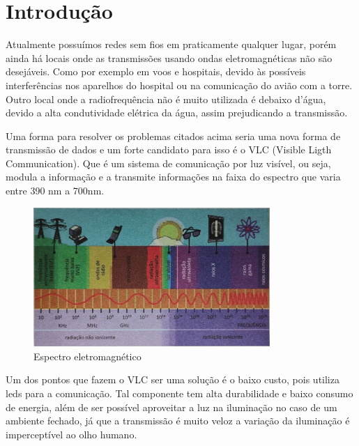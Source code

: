 \section{Introdução}

Atualmente possuímos redes sem fios em praticamente qualquer lugar, porém ainda há locais onde as transmissões usando ondas eletromagnéticas não são desejáveis. Como por exemplo em voos e hospitais, devido às possíveis interferências nos aparelhos do hospital ou na comunicação do avião com a torre. Outro local onde a radiofrequência não é muito utilizada é debaixo d'água, devido a alta condutividade elétrica da água, assim prejudicando a transmissão.

Uma forma para resolver os problemas citados acima seria uma nova forma de transmissão de dados e um forte candidato para isso é o VLC (Visible Ligth Communication). Que é um sistema de comunicação por luz visível, ou seja, modula a informação e a transmite informações na faixa do espectro que varia entre 390 nm a 700nm.

\begin{figure}[h]
  \centering
  \caption{Espectro eletromagnético}
  \includegraphics[width=0.8\textwidth]{images/espectro_eletromagnetico.png}
  
\end{figure}


Um dos pontos que fazem o VLC ser uma solução é o baixo custo, pois utiliza leds para a comunicação. Tal componente tem alta durabilidade e baixo consumo de energia, além de ser possível aproveitar a luz na iluminação no caso de um ambiente fechado, já que a transmissão é muito veloz a variação da iluminação é imperceptível ao olho humano.
